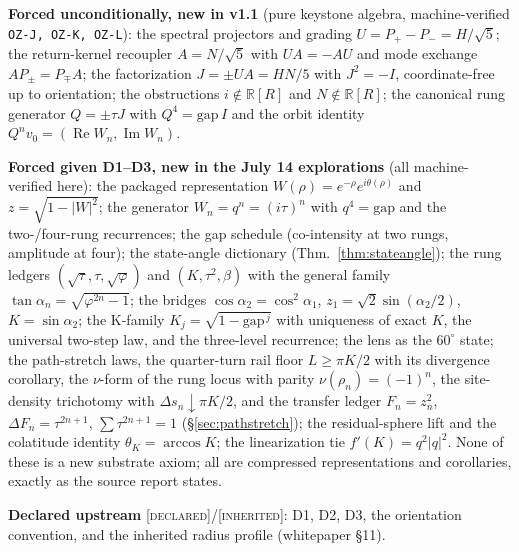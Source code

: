 \documentclass[11pt]{article}
\newcommand{\tagD}{\textcolor{cD}{\textsc{[declared]}}}
\newcommand{\tagI}{\textcolor{cI}{\textsc{[inherited]}}}
\newcommand{\hx}[1]{\textcolor{cC}{\footnotesize\texttt{#1}}}
\newcommand{\R}{\mathbb{R}}
\newcommand{\gp}{\varphi}
\newcommand{\gapc}{\mathrm{gap}}
\DeclareMathOperator{\Rea}{Re}
\DeclareMathOperator{\Ima}{Im}
\theoremstyle{plain}
\theoremstyle{definition}
\theoremstyle{remark}
\begin{document}
\smallskip\noindent
\textbf{Forced unconditionally, new in v1.1} (pure keystone algebra,
machine-verified \hx{OZ-J, OZ-K, OZ-L}): the spectral projectors and grading
$U=P_+-P_-=H/\sqrt5$; the return-kernel recoupler $A=N/\sqrt5$ with
$UA=-AU$ and mode exchange $AP_\pm=P_\mp A$; the factorization
$J=\pm UA=HN/5$ with $J^2=-I$, coordinate-free up to orientation; the
obstructions $i\notin\R[R]$ and $N\notin\R[R]$; the canonical rung generator
$Q=\pm\tau J$ with $Q^4=\gapc\,I$ and the orbit identity $Q^nv_0=(\Rea W_n,
\Ima W_n)$.

\smallskip\noindent
\textbf{Forced given D1--D3, new in the July 14 explorations} (all
machine-verified here): the packaged representation
$W(\rho)=e^{-\rho}e^{i\theta(\rho)}$ and $z=\sqrt{1-|W|^2}$; the generator
$W_n=q^n=(i\tau)^n$ with $q^4=\gapc$ and the two-/four-rung recurrences; the gap
schedule (co-intensity at two rungs, amplitude at four); the state-angle
dictionary (Thm.~\ref{thm:stateangle}); the rung ledgers
$(\sqrt\tau,\tau,\sqrt\gp)$ and $(K,\tau^2,\beta)$ with the general family
$\tan\alpha_n=\sqrt{\gp^{2n}-1}$; the bridges $\cos\alpha_2=\cos^2\alpha_1$,
$z_1=\sqrt2\sin(\alpha_2/2)$, $K=\sin\alpha_2$; the K-family
$K_j=\sqrt{1-\gapc^{\,j}}$ with uniqueness of exact $K$, the universal two-step
law, and the three-level recurrence; the lens as the $60^\circ$ state; the
path-stretch laws, the quarter-turn rail floor $L\ge\pi K/2$ with its
divergence corollary, the $\nu$-form of the rung locus with parity
$\nu(\rho_n)=(-1)^n$, the site-density trichotomy with
$\Delta s_n\downarrow\pi K/2$, and the transfer ledger $F_n=z_n^2$,
$\Delta F_n=\tau^{2n+1}$, $\sum\tau^{2n+1}=1$ (\S\ref{sec:pathstretch}); the
residual-sphere lift and the colatitude identity $\theta_K=\arccos K$; the
linearization tie $f'(K)=q^2|q|^2$. None of these is a new substrate axiom; all
are compressed representations and corollaries, exactly as the source report
states.

\smallskip\noindent
\textbf{Declared upstream} \tagD{}/\tagI{}: D1, D2, D3, the orientation
convention, and the inherited radius profile (whitepaper \S11).
\end{document}
